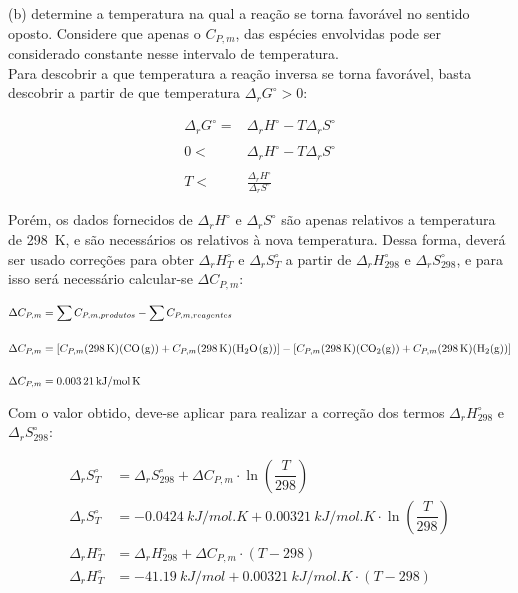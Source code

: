 (b) determine a temperatura na qual a reação se torna favorável no sentido 
oposto. Considere que apenas o \(C_{P,m}\), das espécies envolvidas pode ser
considerado constante nesse intervalo de temperatura.\\

Para descobrir a que temperatura a reação inversa se torna favorável, basta descobrir a partir de que temperatura \(\Delta_r G^\circ > 0\):

\begin{align*}
	\Delta_r G^\circ = &\Delta_r H^\circ - T \Delta_r S^\circ \\ \\
	0 < &\Delta_r H^\circ - T \Delta_r S^\circ \\ \\
	T < &\frac{\Delta_r H^\circ}{\Delta_r S^\circ}
\end{align*}

Porém, os dados fornecidos de \(\Delta_r H^\circ\)  e  \(\Delta_r S^\circ\) são apenas relativos a temperatura de \qty{298}{K}, e são necessários os relativos à nova temperatura. Dessa forma, deverá ser usado correções para obter \(\Delta_r H^\circ_{T}\) e \(\Delta_r S^\circ_{T}\)  a partir de \(\Delta_r H^\circ_{298}\) e \(\Delta_r S^\circ_{298} \), e para isso será necessário calcular-se \(\Delta C_{P,m}\):

 \begin{align*}
 	\Delta C_{P,m} &= \sum C_{P,m, produtos} - \sum C_{P,m, reagentes}\\ \\
 	\Delta C_{P,m} &= [C_{P,m} (\qty{298}{K}) (\ce{CO(g)}) + C_{P,m}
    (\qty{298}{K}) (\ce{H2O(g)})] - [ C_{P,m} (\qty{298}{K}) (\ce{CO2(g)}) +
    C_{P,m} (\qty{298}{K}) (\ce{H2(g)})]\\ \\
 	\Delta C_{P,m} &= \qty{0,00321}{kJ \per mol . K}
 \end{align*}
 
Com o valor obtido, deve-se aplicar para realizar a correção dos termos \(\Delta_rH^\circ_{298}\) e \(\Delta_rS^\circ_{298} \):

\begin{align*}
	\Delta_rS^\circ_{T} &= \Delta_rS^\circ_{298} +\Delta C_{P,m} \cdot \ln (\dfrac{T}{298}) \\
	\Delta_rS^\circ_{T} &= \qty{-0,0424}{kJ \per mol . K}
    +\qty{0,00321}{kJ \per mol . K} \cdot \ln (\dfrac{T}{298}) \\ \\
	\Delta_rH^\circ_{T} &= \Delta_rH^\circ_{298} +\Delta C_{P,m} \cdot (T - 298) \\
	\Delta_rH^\circ_{T} &= \qty{-41,19}{kJ \per mol }
    +\qty{0,00321}{kJ \per mol . K} \cdot (T - 298) \\
\end{align*}

